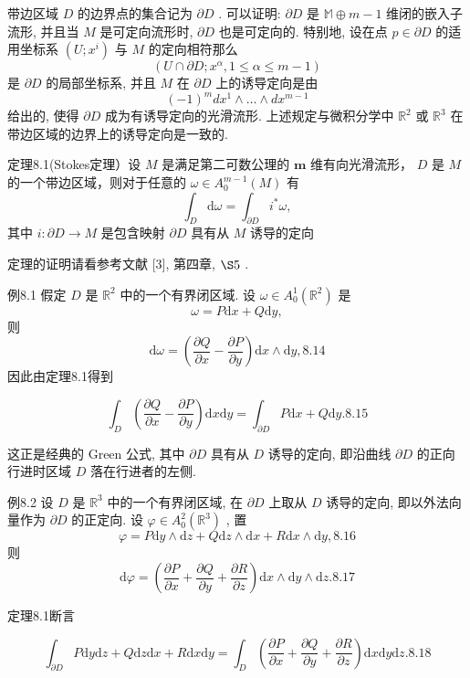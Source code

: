 带边区域  $D$  的边界点的集合记为  $\partial D$ . 可以证明:  $\partial D$  是  $\mathbb{M} \oplus m - 1$  维闭的嵌入子流形, 并且当  $M$  是可定向流形时,  $\partial D$  也是可定向的. 特别地, 设在点  $p \in \partial D$  的适用坐标系  $(U; x^i)$  与  $M$  的定向相符那么
$$
\left(U \cap \partial D; x ^ {\alpha}, 1 \leqslant \alpha \leqslant m - 1\right)
$$
是  $\partial D$  的局部坐标系, 并且  $M$  在  $\partial D$  上的诱导定向是由
$$
(- 1) ^ {m} d x ^ {1} \wedge \dots \wedge d x ^ {m - 1} %
$$
给出的, 使得  $\partial D$  成为有诱导定向的光滑流形. 上述规定与微积分学中  $\mathbb{R}^2$  或  $\mathbb{R}^3$  在带边区域的边界上的诱导定向是一致的.

定理8.1(Stokes定理）设  $M$  是满足第二可数公理的  $\pmb{m}$  维有向光滑流形，  $D$  是  $M$  的一个带边区域，则对于任意的  $\omega \in A_0^{m - 1}(M)$  有
$$
\int_ {D} \mathrm {d} \omega = \int_ {\partial D} i ^ {*} \omega , %
$$
其中  $i:\partial D\to M$  是包含映射  $\partial D$  具有从  $M$  诱导的定向

定理的证明请看参考文献 [3], 第四章,  $\S 5$ .

例8.1 假定  $D$  是  $\mathbb{R}^2$  中的一个有界闭区域. 设  $\omega \in A_0^1 (\mathbb{R}^2)$  是
$$
\omega = P \mathrm {d} x + Q \mathrm {d} y, %
$$
则
$$
\mathrm {d} \omega = \left(\frac {\partial Q}{\partial x} - \frac {\partial P}{\partial y}\right) \mathrm {d} x \wedge \mathrm {d} y,  {8.14}
$$
因此由定理8.1得到

$$
\int_ {D} \left(\frac {\partial Q}{\partial x} - \frac {\partial P}{\partial y}\right) \mathrm {d} x \mathrm {d} y = \int_ {\partial D} P \mathrm {d} x + Q \mathrm {d} y.  {8.15}
$$

这正是经典的 Green 公式, 其中  $\partial D$  具有从  $D$  诱导的定向, 即沿曲线  $\partial D$  的正向行进时区域  $D$  落在行进者的左侧.

例8.2 设  $D$  是  $\mathbb{R}^3$  中的一个有界闭区域, 在  $\partial D$  上取从  $D$  诱导的定向, 即以外法向量作为  $\partial D$  的正定向. 设  $\varphi \in A_0^2(\mathbb{R}^3)$ , 置
$$
\varphi = P \mathrm {d} y \wedge \mathrm {d} z + Q \mathrm {d} z \wedge \mathrm {d} x + R \mathrm {d} x \wedge \mathrm {d} y,  {8.16}
$$
则
$$
\mathrm {d} \varphi = \left(\frac {\partial P}{\partial x} + \frac {\partial Q}{\partial y} + \frac {\partial R}{\partial z}\right) \mathrm {d} x \wedge \mathrm {d} y \wedge \mathrm {d} z.  {8.17}
$$

定理8.1断言

$$
\int_ {\partial D} P \mathrm {d} y \mathrm {d} z + Q \mathrm {d} z \mathrm {d} x + R \mathrm {d} x \mathrm {d} y = \int_ {D} \left(\frac {\partial P}{\partial x} + \frac {\partial Q}{\partial y} + \frac {\partial R}{\partial z}\right) \mathrm {d} x \mathrm {d} y \mathrm {d} z.  {8.18}
$$

